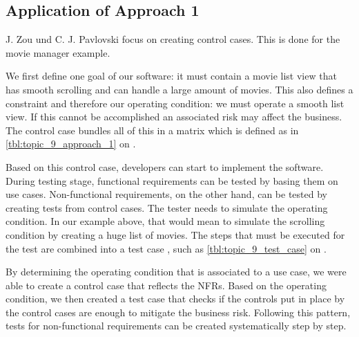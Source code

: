 \subsection{Application of Approach 1}

J. Zou und C. J. Pavlovski focus on creating control cases. This is done for the movie manager example.

We first define one goal of our software:
it must contain a movie list view that has smooth scrolling and can handle a large amount of movies.
This also defines a constraint and therefore our operating condition: we must operate a smooth list view.
If this cannot be accomplished an associated risk may affect the business. The control case bundles all of this in a matrix which is defined as in \autoref{tbl:topic_9_approach_1} on .

Based on this control case, developers can start to implement the software. During
testing stage, functional requirements can be tested by basing them on use cases. Non-functional requirements, on the other hand, can be tested by creating tests from control cases.
The tester needs to simulate the operating condition.
In our example above, that would mean to simulate the scrolling condition by creating a huge list of movies.
The steps that must be executed for the test are combined into a test case , such as \autoref{tbl:topic_9_test_case} on .

By determining the operating condition that is associated to a use case, we were able to create a control case that reflects the NFRs.
Based on the operating condition, we then created a test case that checks if the controls put in place by the control cases are enough to mitigate the business risk.
Following this pattern, tests for non-functional requirements can be created systematically step by step.

\clearpage

